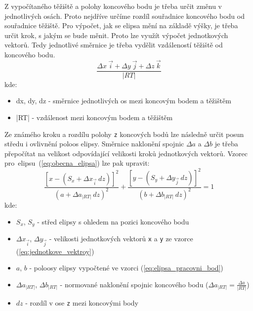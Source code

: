         Z vypočítaného těžiště a polohy koncového bodu je třeba určit změnu v 
        jednotlivých osách. Proto nejdříve určíme rozdíl souřadnice koncového bodu od 
        souřadnice těžiště. Pro výpočet, jak se elipsa mění na základě výšky, je třeba
        určit krok, s jakým se bude měnit. Proto lze využít výpočet jednotkových vektorů.
        Tedy jednotlivé směrnice je třeba vydělit vzdáleností těžiště od koncového bodu.
        \begin{equation}
            \frac{\Delta x\ \vec{i} + \Delta y\ \vec{j} + \Delta z\ \vec{k}}{|RT|}
            \label{eq:jednotkove_vektroy}
        \end{equation}
        kde:
        \begin{itemize}
            \item []dx, dy, dz - směrnice jednotlivých os mezi koncovým bodem a těžištěm
            \item []|RT| - vzdálenost mezi koncovým bodem a těžištěm
        \end{itemize}
        \vspace{1em}

        Ze známého kroku a rozdílu polohy \texttt{z} koncových bodů lze následně určit
        posun středu i ovlivnění poloos elipsy. Směrnice naklonění spojnic $\Delta a$
        a $\Delta b$ je třeba přepočítat na velikost odpovídající velikosti kroků 
        jednotkových vektorů. Vzorec pro~elipsu~(\ref{eq:obecna_elipsa}) lze pak 
        upravit:
        \begin{equation}
            \frac{[x - (S_x + \Delta x_{\vec{i}}\ dz)]^2}{(a + \Delta a_{|RT|}\ dz)^2} + \frac{[y - (S_y + \Delta y_{\vec{j}}\ dz)]^2}{(b + \Delta b_{|RT|}\ dz)^2} = 1
            \label{eq:elipsa_final}
        \end{equation}
        kde:
        \begin{itemize}
            \item []$S_x$, $S_y$ - střed elipsy s ohledem na pozici koncového bodu
            \item []$\Delta x_{\vec{i}}$, $\Delta y_{\vec{j}}$ - velikosti jednotkových
                 vektorů \texttt{x} a \texttt{y} ze vzorce (\ref{eq:jednotkove_vektroy})
            \item []$a$, $b$ - poloosy elipsy vypočtené ve vzorci 
                (\ref{eq:elipsa_pracovni_bod})
            \item []$\Delta a_{|RT|}$, $\Delta b_{|RT|}$ - normované naklonění spojnic 
                koncového bodu ($\Delta a_{|RT|}=\frac{\Delta a}{|RT|}$)
            \item []$dz$ - rozdíl v ose \texttt{z} mezi koncovými body
        \end{itemize}

